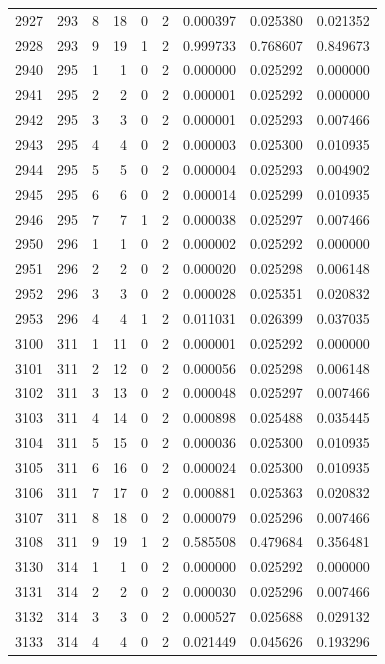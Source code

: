 \begin{longtable}{rrrrrrrrr}
2927 & 293 & 8 & 18 & 0 & 2 & 0.000397 & 0.025380 & 0.021352 \\
2928 & 293 & 9 & 19 & 1 & 2 & 0.999733 & 0.768607 & 0.849673 \\
2940 & 295 & 1 & 1 & 0 & 2 & 0.000000 & 0.025292 & 0.000000 \\
2941 & 295 & 2 & 2 & 0 & 2 & 0.000001 & 0.025292 & 0.000000 \\
2942 & 295 & 3 & 3 & 0 & 2 & 0.000001 & 0.025293 & 0.007466 \\
2943 & 295 & 4 & 4 & 0 & 2 & 0.000003 & 0.025300 & 0.010935 \\
2944 & 295 & 5 & 5 & 0 & 2 & 0.000004 & 0.025293 & 0.004902 \\
2945 & 295 & 6 & 6 & 0 & 2 & 0.000014 & 0.025299 & 0.010935 \\
2946 & 295 & 7 & 7 & 1 & 2 & 0.000038 & 0.025297 & 0.007466 \\
2950 & 296 & 1 & 1 & 0 & 2 & 0.000002 & 0.025292 & 0.000000 \\
2951 & 296 & 2 & 2 & 0 & 2 & 0.000020 & 0.025298 & 0.006148 \\
2952 & 296 & 3 & 3 & 0 & 2 & 0.000028 & 0.025351 & 0.020832 \\
2953 & 296 & 4 & 4 & 1 & 2 & 0.011031 & 0.026399 & 0.037035 \\
3100 & 311 & 1 & 11 & 0 & 2 & 0.000001 & 0.025292 & 0.000000 \\
3101 & 311 & 2 & 12 & 0 & 2 & 0.000056 & 0.025298 & 0.006148 \\
3102 & 311 & 3 & 13 & 0 & 2 & 0.000048 & 0.025297 & 0.007466 \\
3103 & 311 & 4 & 14 & 0 & 2 & 0.000898 & 0.025488 & 0.035445 \\
3104 & 311 & 5 & 15 & 0 & 2 & 0.000036 & 0.025300 & 0.010935 \\
3105 & 311 & 6 & 16 & 0 & 2 & 0.000024 & 0.025300 & 0.010935 \\
3106 & 311 & 7 & 17 & 0 & 2 & 0.000881 & 0.025363 & 0.020832 \\
3107 & 311 & 8 & 18 & 0 & 2 & 0.000079 & 0.025296 & 0.007466 \\
3108 & 311 & 9 & 19 & 1 & 2 & 0.585508 & 0.479684 & 0.356481 \\
3130 & 314 & 1 & 1 & 0 & 2 & 0.000000 & 0.025292 & 0.000000 \\
3131 & 314 & 2 & 2 & 0 & 2 & 0.000030 & 0.025296 & 0.007466 \\
3132 & 314 & 3 & 3 & 0 & 2 & 0.000527 & 0.025688 & 0.029132 \\
3133 & 314 & 4 & 4 & 0 & 2 & 0.021449 & 0.045626 & 0.193296 \\

\end{longtable}
